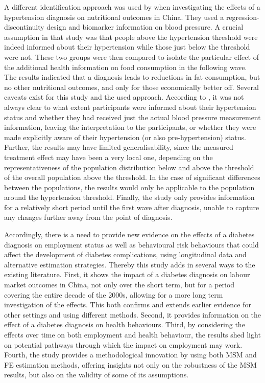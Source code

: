 A different identification approach was used by \textcite{Zhao2013a} when investigating the effects of a hypertension diagnosis on nutritional outcomes in China. They used a regression-discontinuity design and biomarker information on blood pressure. A crucial assumption in that study was that people above the hypertension threshold were indeed informed about their hypertension while those just below the threshold were not. These two groups were then compared to isolate the particular effect of the additional health information on food consumption in the following wave. The results indicated that a diagnosis leads to reductions in fat consumption, but no other nutritional outcomes, and only for those economically better off. Several caveats exist for this study and the used approach. According to \textcite{Zhao2013a}, it was not always clear to what extent participants were informed about their hypertension status and whether they had received just the actual blood pressure measurement information, leaving the interpretation to the participants, or whether they were made explicitly aware of their hypertension (or also pre-hypertension) status. Further, the results may have limited generalisability, since the measured treatment effect may have been a very local one, depending on the representativeness of the population distribution below and above the threshold of the overall population above the threshold. In the case of significant differences between the populations, the results would only be applicable to the population around the hypertension threshold. Finally, the study only provides information for a relatively short period until the first wave after diagnosis, unable to capture any changes further away from the point of diagnosis. 

Accordingly, there is a need to provide new evidence on the effects of a diabetes diagnosis on employment status as well as behavioural risk behaviours that could affect the development of diabetes complications, using longitudinal data and alternative estimation strategies. Thereby this study adds in several ways to the existing literature. First, it shows the impact of a diabetes diagnosis on labour market outcomes in China, not only over the short term, but for a period covering the entire decade of the 2000s, allowing for a more long term investigation of the effects. This both confirms and extends earlier evidence for other settings and using different methods. Second, it provides information on the effect of a diabetes diagnosis on health behaviours. Third, by considering the effects over time on both employment and health behaviour, the results shed light on potential pathways through which the impact on employment may work.  Fourth, the study provides a methodological innovation by using both \ac{MSM} and \ac{FE} estimation methods, offering insights not only on the robustness of the \ac{MSM} results, but also on the validity of some of its assumptions.  


